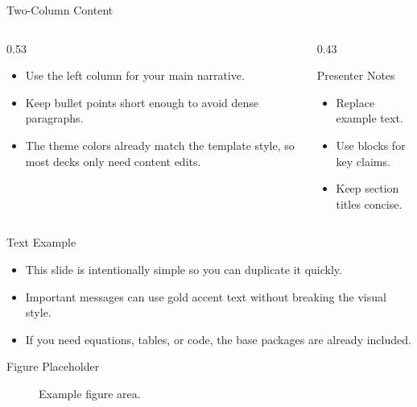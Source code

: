 \documentclass[aspectratio=169]{beamer}
\begin{document}
\begin{frame}{Two-Column Content}
\begin{columns}[T]
    \begin{column}{0.53\linewidth}
        \begin{itemize}
            \item Use the left column for your main narrative.
            \item Keep bullet points short enough to avoid dense paragraphs.
            \item The theme colors already match the template style, so most decks only need content edits.
        \end{itemize}
    \end{column}
    \begin{column}{0.43\linewidth}
        \begin{exampleblock}{Presenter Notes}
        \begin{itemize}
            \item Replace example text.
            \item Use blocks for key claims.
            \item Keep section titles concise.
        \end{itemize}
        \end{exampleblock}
    \end{column}
\end{columns}
\end{frame}

\begin{frame}{Text Example}
\begin{itemize}
    \item This slide is intentionally simple so you can duplicate it quickly.
    \item Important messages can use \alert{gold accent text} without breaking the visual style.
    \item If you need equations, tables, or code, the base packages are already included.
\end{itemize}
\end{frame}

\begin{frame}{Figure Placeholder}
    \begin{figure}
        \centering
        \caption{Example figure area.}
    \end{figure}
\end{frame}
\end{document}
